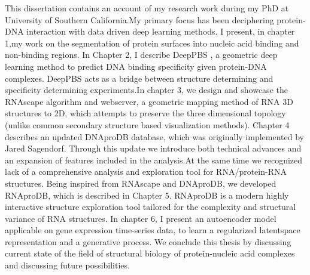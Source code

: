 This dissertation contains an account of my research work during my PhD at University of Southern California.My primary focus has been deciphering protein-DNA interaction with data driven deep learning methods. I present, in chapter 1,my work on the segmentation of protein surfaces into nucleic acid binding and non-binding regions. In Chapter 2, I describe DeepPBS , a geometric deep learning method to predict DNA binding specificity given protein-DNA complexes. DeepPBS acts as a bridge between structure determining and specificity determining experiments.In chapter 3, we design and showcase the RNAscape algorithm and webserver, a geometric mapping method of RNA 3D structures to 2D, which attempts to preserve the three dimensional topology (unlike common secondary structure based visualization methods). Chapter 4 describes an updated DNAproDB database, which was originally implemented by Jared Sagendorf. Through this update we introduce both technical advances and an expansion of features included in the analysis.At the same time we recognized lack of a comprehensive analysis and exploration tool for RNA/protein-RNA structures. Being inspired from RNAscape and DNAproDB, we developed RNAproDB, which is described in Chapter 5. RNAproDB is a modern highly interactive structure exploration tool tailored for the complexity and structural variance of RNA structures. In chapter 6, I present an autoencoder model applicable on gene expression time-series data, to learn a regularized latentspace representation and a generative process. We conclude this thesis by discussing current state of the field of structural biology of protein-nucleic acid complexes and discussing future possibilities.
